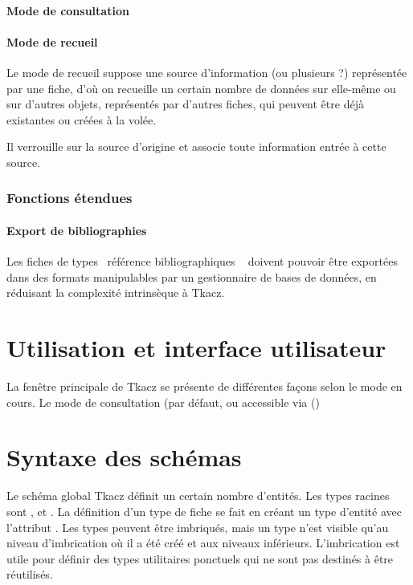 \documentclass[11pt,french]{article}
\makeatletter
\providecommand{\og}{\leavevmode\flqq~}%
\providecommand{\fg}{\ifdim\lastskip>\z@\unskip\fi~\frqq}%
\makeatother
\begin{document}
\subsection{Mode de consultation}


\subsection{Mode de recueil }

Le mode de recueil suppose une source d'information (ou plusieurs
?) représentée par une fiche, d'où on recueille un certain nombre
de données sur elle-même ou sur d'autres objets, représentés par d'autres
fiches, qui peuvent être déjà existantes ou créées à la volée.

Il verrouille sur la source d'origine et associe toute information
entrée à cette source.


\section{Fonctions étendues}


\subsection{Export de bibliographies}

Les fiches de types \og référence bibliographiques \fg{} doivent
pouvoir être exportées dans des formats manipulables par un gestionnaire
de bases de données, en réduisant la complexité intrinsèque à Tkacz.


\part{Utilisation et interface utilisateur}

La fenêtre principale de Tkacz se présente de différentes façons selon
le mode en cours. Le mode de consultation (par défaut, ou accessible
via  ()


\part{Syntaxe des schémas}

Le schéma global Tkacz définit un certain nombre d'entités. Les types
racines sont ,  et .
La définition d'un type de fiche se fait en créant un type d'entité
avec l'attribut . Les types peuvent être imbriqués,
mais un type n'est visible qu'au niveau d'imbrication où il a été
créé et aux niveaux inférieurs. L'imbrication est utile pour définir
des types utilitaires ponctuels qui ne sont pas destinés à être réutilisés. 
\end{document}
